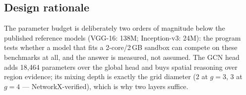 \subsection{Design rationale}
The parameter budget is deliberately two orders of magnitude below the
published reference models (VGG-16: 138M; Inception-v3: 24M): the program
tests whether a model that fits a 2-core/2\,GB sandbox can compete on
these benchmarks at all, and the answer is measured, not assumed. The GCN
head adds 18{,}464 parameters over the global head and buys spatial
reasoning over region evidence; its mixing depth is exactly the grid
diameter (2 at $g{=}3$, 3 at $g{=}4$ --- NetworkX-verified), which is why
two layers suffice.
